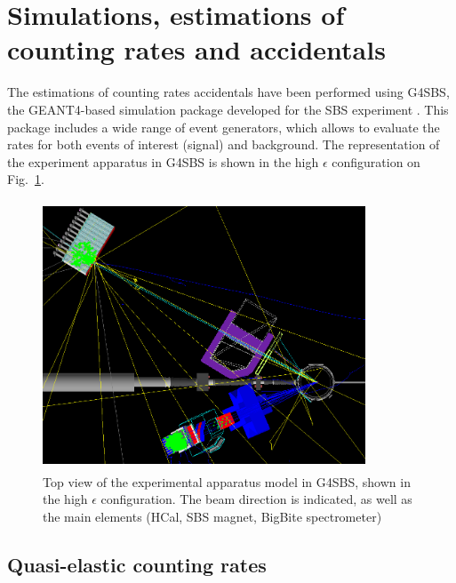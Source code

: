 
\section{Simulations, estimations of counting rates and accidentals}
\label{sec:simu}

The estimations of counting rates accidentals have been performed using G4SBS, the GEANT4-based simulation package developed for the SBS experiment \cite{g4sbs}.
This package includes a wide range of event generators, which allows to evaluate the rates for both events of interest (signal) and background.
The representation of the experiment apparatus in G4SBS is shown in the high $\epsilon$ configuration on Fig.~\ref{fig:g4sbssetup}. 
%
\begin{figure}[!h]
  \begin{center}
    \includegraphics[width=9.6cm,height=8cm]{Plots/SetupHiEPoint.png}
    \caption{Top view of the experimental apparatus model in G4SBS, shown in the high $\epsilon$ configuration. The beam direction is indicated, as well as the main elements (HCal, SBS magnet, BigBite spectrometer)}
    \label{fig:g4sbssetup}
  \end{center}
\end{figure}
%

\subsection{Quasi-elastic counting rates}

